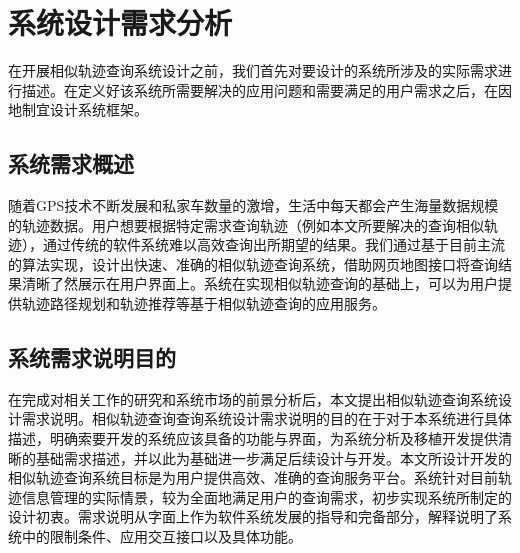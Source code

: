 \section{系统设计需求分析}
\label{sec:overall description}
在开展相似轨迹查询系统设计之前，我们首先对要设计的系统所涉及的实际需求进行描述。在定义好该系统所需要解决的应用问题和需要满足的用户需求之后，在因地制宜设计系统框架。

\subsection{系统需求概述}
\label{subsec:general requirements}
随着GPS技术不断发展和私家车数量的激增，生活中每天都会产生海量数据规模的轨迹数据。用户想要根据特定需求查询轨迹（例如本文所要解决的查询相似轨迹），通过传统的软件系统难以高效查询出所期望的结果。我们通过基于目前主流的算法实现，设计出快速、准确的相似轨迹查询系统，借助网页地图接口将查询结果清晰了然展示在用户界面上。系统在实现相似轨迹查询的基础上，可以为用户提供轨迹路径规划和轨迹推荐等基于相似轨迹查询的应用服务。

\subsection{系统需求说明目的}
\label{subsec:propose}
在完成对相关工作的研究和系统市场的前景分析后，本文提出相似轨迹查询系统设计需求说明。相似轨迹查询查询系统设计需求说明的目的在于对于本系统进行具体描述，明确索要开发的系统应该具备的功能与界面，为系统分析及移植开发提供清晰的基础需求描述，并以此为基础进一步满足后续设计与开发。本文所设计开发的相似轨迹查询系统目标是为用户提供高效、准确的查询服务平台。系统针对目前轨迹信息管理的实际情景，较为全面地满足用户的查询需求，初步实现系统所制定的设计初衷。需求说明从字面上作为软件系统发展的指导和完备部分，解释说明了系统中的限制条件、应用交互接口以及具体功能。


